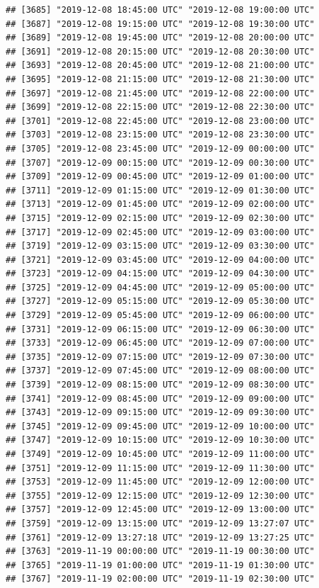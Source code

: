 \documentclass{article}\usepackage[]{graphicx}\usepackage[]{color}
\makeatletter
\newenvironment{kframe}{%
 \def\at@end@of@kframe{}%
 \ifinner\ifhmode%
  \def\at@end@of@kframe{\end{minipage}}%
  \begin{minipage}{\columnwidth}%
 \fi\fi%
 \def\FrameCommand##1{\hskip\@totalleftmargin \hskip-\fboxsep
 \colorbox{shadecolor}{##1}\hskip-\fboxsep
     \hskip-\linewidth \hskip-\@totalleftmargin \hskip\columnwidth}%
 \MakeFramed {\advance\hsize-\width
   \@totalleftmargin\z@ \linewidth\hsize
   \@setminipage}}%
 {\par\unskip\endMakeFramed%
 \at@end@of@kframe}
\newenvironment{knitrout}{}{} %
\makeatother
\begin{document}
\begin{knitrout}
\begin{kframe}
\begin{verbatim}
## [3685] "2019-12-08 18:45:00 UTC" "2019-12-08 19:00:00 UTC"
## [3687] "2019-12-08 19:15:00 UTC" "2019-12-08 19:30:00 UTC"
## [3689] "2019-12-08 19:45:00 UTC" "2019-12-08 20:00:00 UTC"
## [3691] "2019-12-08 20:15:00 UTC" "2019-12-08 20:30:00 UTC"
## [3693] "2019-12-08 20:45:00 UTC" "2019-12-08 21:00:00 UTC"
## [3695] "2019-12-08 21:15:00 UTC" "2019-12-08 21:30:00 UTC"
## [3697] "2019-12-08 21:45:00 UTC" "2019-12-08 22:00:00 UTC"
## [3699] "2019-12-08 22:15:00 UTC" "2019-12-08 22:30:00 UTC"
## [3701] "2019-12-08 22:45:00 UTC" "2019-12-08 23:00:00 UTC"
## [3703] "2019-12-08 23:15:00 UTC" "2019-12-08 23:30:00 UTC"
## [3705] "2019-12-08 23:45:00 UTC" "2019-12-09 00:00:00 UTC"
## [3707] "2019-12-09 00:15:00 UTC" "2019-12-09 00:30:00 UTC"
## [3709] "2019-12-09 00:45:00 UTC" "2019-12-09 01:00:00 UTC"
## [3711] "2019-12-09 01:15:00 UTC" "2019-12-09 01:30:00 UTC"
## [3713] "2019-12-09 01:45:00 UTC" "2019-12-09 02:00:00 UTC"
## [3715] "2019-12-09 02:15:00 UTC" "2019-12-09 02:30:00 UTC"
## [3717] "2019-12-09 02:45:00 UTC" "2019-12-09 03:00:00 UTC"
## [3719] "2019-12-09 03:15:00 UTC" "2019-12-09 03:30:00 UTC"
## [3721] "2019-12-09 03:45:00 UTC" "2019-12-09 04:00:00 UTC"
## [3723] "2019-12-09 04:15:00 UTC" "2019-12-09 04:30:00 UTC"
## [3725] "2019-12-09 04:45:00 UTC" "2019-12-09 05:00:00 UTC"
## [3727] "2019-12-09 05:15:00 UTC" "2019-12-09 05:30:00 UTC"
## [3729] "2019-12-09 05:45:00 UTC" "2019-12-09 06:00:00 UTC"
## [3731] "2019-12-09 06:15:00 UTC" "2019-12-09 06:30:00 UTC"
## [3733] "2019-12-09 06:45:00 UTC" "2019-12-09 07:00:00 UTC"
## [3735] "2019-12-09 07:15:00 UTC" "2019-12-09 07:30:00 UTC"
## [3737] "2019-12-09 07:45:00 UTC" "2019-12-09 08:00:00 UTC"
## [3739] "2019-12-09 08:15:00 UTC" "2019-12-09 08:30:00 UTC"
## [3741] "2019-12-09 08:45:00 UTC" "2019-12-09 09:00:00 UTC"
## [3743] "2019-12-09 09:15:00 UTC" "2019-12-09 09:30:00 UTC"
## [3745] "2019-12-09 09:45:00 UTC" "2019-12-09 10:00:00 UTC"
## [3747] "2019-12-09 10:15:00 UTC" "2019-12-09 10:30:00 UTC"
## [3749] "2019-12-09 10:45:00 UTC" "2019-12-09 11:00:00 UTC"
## [3751] "2019-12-09 11:15:00 UTC" "2019-12-09 11:30:00 UTC"
## [3753] "2019-12-09 11:45:00 UTC" "2019-12-09 12:00:00 UTC"
## [3755] "2019-12-09 12:15:00 UTC" "2019-12-09 12:30:00 UTC"
## [3757] "2019-12-09 12:45:00 UTC" "2019-12-09 13:00:00 UTC"
## [3759] "2019-12-09 13:15:00 UTC" "2019-12-09 13:27:07 UTC"
## [3761] "2019-12-09 13:27:18 UTC" "2019-12-09 13:27:25 UTC"
## [3763] "2019-11-19 00:00:00 UTC" "2019-11-19 00:30:00 UTC"
## [3765] "2019-11-19 01:00:00 UTC" "2019-11-19 01:30:00 UTC"
## [3767] "2019-11-19 02:00:00 UTC" "2019-11-19 02:30:00 UTC"

\end{verbatim}
\end{kframe}
\end{knitrout}
\end{document}
